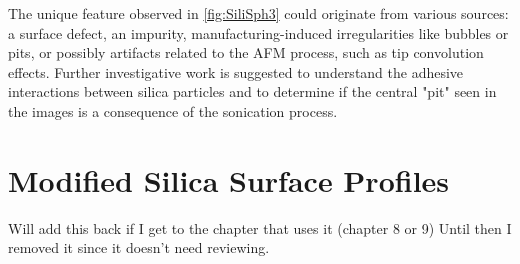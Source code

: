 The unique feature observed in \ref{fig:SiliSph3} could originate from various sources: a surface defect, an impurity, manufacturing-induced irregularities like bubbles or pits, or possibly artifacts related to the AFM process, such as tip convolution effects. Further investigative work is suggested to understand the adhesive interactions between silica particles and to determine if the central "pit" seen in the images is a consequence of the sonication process.

\section{Modified Silica Surface Profiles}
Will add this back if I get to the chapter that uses it (chapter 8 or 9)
Until then I removed it since it doesn't need reviewing.


\newpage